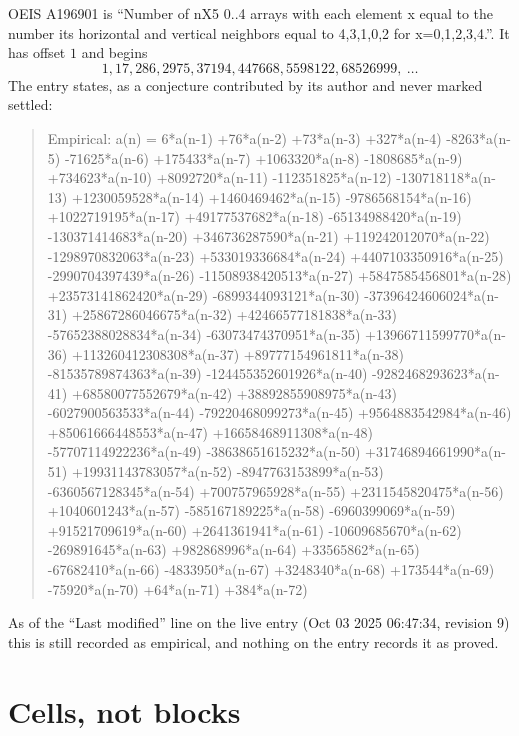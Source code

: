 \documentclass[11pt,a4paper]{article}
\theoremstyle{plain}
\theoremstyle{definition}
\begin{document}
OEIS A196901 is ``Number of nX5 0..4 arrays with each element x equal to the number its horizontal and vertical neighbors equal to 4,3,1,0,2 for x=0,1,2,3,4.''. It has offset $1$ and begins
\[
1, 17, 286, 2975, 37194, 447668, 5598122, 68526999,\ \dots
\]
The entry states, as a conjecture contributed by its author and never marked settled:
\begin{quote}
Empirical: a(n) = 6*a(n-1) +76*a(n-2) +73*a(n-3) +327*a(n-4) -8263*a(n-5) -71625*a(n-6) +175433*a(n-7) +1063320*a(n-8) -1808685*a(n-9) +734623*a(n-10) +8092720*a(n-11) -112351825*a(n-12) -130718118*a(n-13) +1230059528*a(n-14) +1460469462*a(n-15) -9786568154*a(n-16) +1022719195*a(n-17) +49177537682*a(n-18) -65134988420*a(n-19) -130371414683*a(n-20) +346736287590*a(n-21) +119242012070*a(n-22) -1298970832063*a(n-23) +533019336684*a(n-24) +4407103350916*a(n-25) -2990704397439*a(n-26) -11508938420513*a(n-27) +5847585456801*a(n-28) +23573141862420*a(n-29) -6899344093121*a(n-30) -37396424606024*a(n-31) +25867286046675*a(n-32) +42466577181838*a(n-33) -57652388028834*a(n-34) -63073474370951*a(n-35) +13966711599770*a(n-36) +113260412308308*a(n-37) +89777154961811*a(n-38) -81535789874363*a(n-39) -124455352601926*a(n-40) -9282468293623*a(n-41) +68580077552679*a(n-42) +38892855908975*a(n-43) -6027900563533*a(n-44) -79220468099273*a(n-45) +9564883542984*a(n-46) +85061666448553*a(n-47) +16658468911308*a(n-48) -57707114922236*a(n-49) -38638651615232*a(n-50) +31746894661990*a(n-51) +19931143783057*a(n-52) -8947763153899*a(n-53) -6360567128345*a(n-54) +700757965928*a(n-55) +2311545820475*a(n-56) +1040601243*a(n-57) -585167189225*a(n-58) -6960399069*a(n-59) +91521709619*a(n-60) +2641361941*a(n-61) -10609685670*a(n-62) -269891645*a(n-63) +982868996*a(n-64) +33565862*a(n-65) -67682410*a(n-66) -4833950*a(n-67) +3248340*a(n-68) +173544*a(n-69) -75920*a(n-70) +64*a(n-71) +384*a(n-72)
\end{quote}
As of the ``Last modified'' line on the live entry (Oct 03 2025 06:47:34, revision 9) this is still
recorded as empirical, and nothing on the entry records it as proved.

\section{Cells, not blocks}
\end{document}
